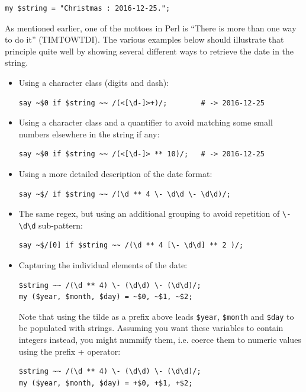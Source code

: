 \begin{verbatim}
my $string = "Christmas : 2016-12-25.";
\end{verbatim}
%

As mentioned earlier, one of the mottoes in Perl is ``There 
is more than one way to do it'' (TIMTOWTDI). The various 
examples below should illustrate that principle quite well 
by showing several different ways to retrieve the date in 
the string.

\begin{itemize}

\item Using a character class (digits and dash):

\begin{verbatim}
say ~$0 if $string ~~ /(<[\d-]>+)/;        # -> 2016-12-25
\end{verbatim}
%

\item Using a character class and a quantifier to avoid 
matching some small numbers elsewhere in the string if any:

\begin{verbatim}
say ~$0 if $string ~~ /(<[\d-]> ** 10)/;   # -> 2016-12-25
\end{verbatim}
%

\item Using a more detailed description of the date format:
\begin{verbatim}
say ~$/ if $string ~~ /(\d ** 4 \- \d\d \- \d\d)/;
\end{verbatim}
%

\item The same regex, but using an additional grouping to avoid 
repetition of \verb'\- \d\d' sub-pattern: 

\begin{verbatim}
say ~$/[0] if $string ~~ /(\d ** 4 [\- \d\d] ** 2 )/; 
\end{verbatim}
%

\item Capturing the individual elements of the date:
\begin{verbatim}
$string ~~ /(\d ** 4) \- (\d\d) \- (\d\d)/;
my ($year, $month, $day) = ~$0, ~$1, ~$2;
\end{verbatim}
%
Note that using the tilde as a prefix above leads 
\verb'$year', \verb'$month' and \verb'$day' to be 
populated with strings. Assuming you want these variables 
to contain integers instead, you might nummify them, i.e. 
coerce them to numeric values using the prefix + operator:
\begin{verbatim}
$string ~~ /(\d ** 4) \- (\d\d) \- (\d\d)/;
my ($year, $month, $day) = +$0, +$1, +$2;
\end{verbatim}
%
 


\end{itemize}
